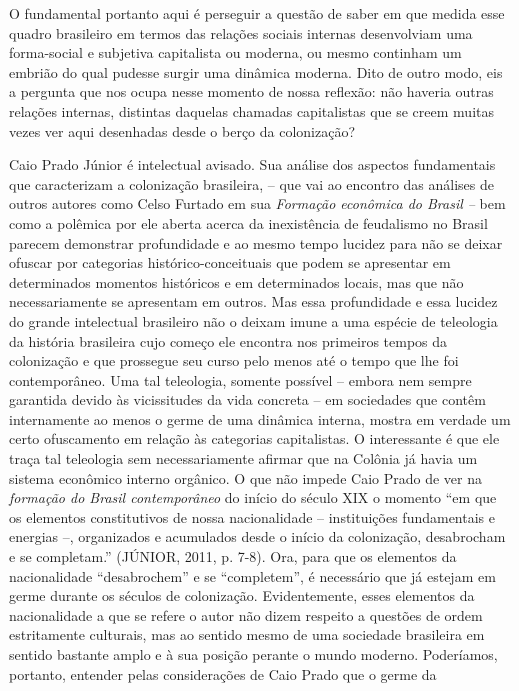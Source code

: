 O fundamental portanto aqui é perseguir a questão de saber em que medida
esse quadro brasileiro em termos das relações sociais internas
desenvolviam uma forma-social e subjetiva capitalista ou moderna, ou
mesmo continham um embrião do qual pudesse surgir uma dinâmica moderna.
Dito de outro modo, eis a pergunta que nos ocupa nesse momento de nossa
reflexão: não haveria outras relações internas, distintas daquelas
chamadas capitalistas que se creem muitas vezes ver aqui desenhadas
desde o berço da colonização?

Caio Prado Júnior é intelectual avisado. Sua análise dos aspectos
fundamentais que caracterizam a colonização brasileira, -- que vai ao
encontro das análises de outros autores como Celso Furtado em sua
\emph{Formação econômica do Brasil --} bem como a polêmica por ele
aberta acerca da inexistência de feudalismo no Brasil parecem demonstrar
profundidade e ao mesmo tempo lucidez para não se deixar ofuscar por
categorias histórico-conceituais que podem se apresentar em determinados
momentos históricos e em determinados locais, mas que não
necessariamente se apresentam em outros. Mas essa profundidade e essa
lucidez do grande intelectual brasileiro não o deixam imune a uma
espécie de teleologia da história brasileira cujo começo ele encontra
nos primeiros tempos da colonização e que prossegue seu curso pelo menos
até o tempo que lhe foi contemporâneo. Uma tal teleologia, somente
possível -- embora nem sempre garantida devido às vicissitudes da vida
concreta -- em sociedades que contêm internamente ao menos o germe de
uma dinâmica interna, mostra em verdade um certo ofuscamento em relação
às categorias capitalistas. O interessante é que ele traça tal
teleologia sem necessariamente afirmar que na Colônia já havia um
sistema econômico interno orgânico. O que não impede Caio Prado de ver
na \emph{formação do Brasil contemporâneo} do início do século XIX o
momento ``em que os elementos constitutivos de nossa nacionalidade --
instituições fundamentais e energias --, organizados e acumulados desde
o início da colonização, desabrocham e se completam.'' (JÚNIOR, 2011, p.
7-8). Ora, para que os elementos da nacionalidade ``desabrochem'' e se
``completem'', é necessário que já estejam em germe durante os séculos
de colonização. Evidentemente, esses elementos da nacionalidade a que se
refere o autor não dizem respeito a questões de ordem estritamente
culturais, mas ao sentido mesmo de uma sociedade brasileira em sentido
bastante amplo e à sua posição perante o mundo moderno. Poderíamos,
portanto, entender pelas considerações de Caio Prado que o germe da
